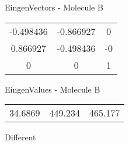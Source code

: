 \begin{multicols}{2}
\begin{center}
\vtab
 EingenVectors - Molecule B     \\
\vtab
\begin{tabular}{|c c c|}
-0.498436	 & 	-0.866927	 & 	0	 \\
0.866927	 & 	-0.498436	 & 	-0	 \\
0	 & 	0	 & 	1
\end{tabular}

\vtab
 EingenValues - Molecule B     \\
\vtab
\begin{tabular}{|c c c|}
34.6869	 & 	449.234	 & 	465.177	 \\
\end{tabular}

\end{center}
\end{multicols}
\begin{center}
\vtab
\vtab
\textcolor{NavyBlue}{\Large Different}
\end{center}

 \newpage

